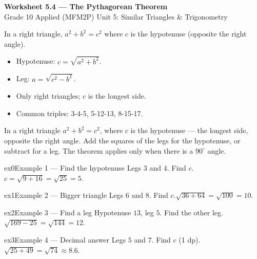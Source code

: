 \documentclass[11pt]{article}
\begin{document}
\begin{center}
{\LARGE\bfseries\color{titleblue}Worksheet 5.4 --- The Pythagorean Theorem}\\[2pt]
{\small Grade 10 Applied (MFM2P) \textperiodcentered{} Unit 5: Similar Triangles \& Trigonometry}
\end{center}

\begin{ideabox}
In a right triangle, $a^2+b^2=c^2$ where $c$ is the hypotenuse (opposite the right angle).
\begin{itemize}[leftmargin=*,itemsep=2pt]
  \item Hypotenuse: $c=\sqrt{a^2+b^2}$.
  \item Leg: $a=\sqrt{c^2-b^2}$.
  \item Only right triangles; $c$ is the longest side.
  \item Common triples: 3-4-5, 5-12-13, 8-15-17.
\end{itemize}
\end{ideabox}

\begin{learnbox}
In a right triangle $a^2+b^2=c^2$, where $c$ is the hypotenuse — the longest side, opposite the right angle.
Add the squares of the legs for the hypotenuse, or subtract for a leg.
The theorem applies only when there is a $90^\circ$ angle.
\end{learnbox}


\begin{example}{ex0}{Example 1 --- Find the hypotenuse}
Legs $3$ and $4$. Find $c$.\soln $c=\sqrt{9+16}=\sqrt{25}=5$.
\end{example}

\begin{example}{ex1}{Example 2 --- Bigger triangle}
Legs $6$ and $8$. Find $c$.\soln $\sqrt{36+64}=\sqrt{100}=10$.
\end{example}

\begin{example}{ex2}{Example 3 --- Find a leg}
Hypotenuse $13$, leg $5$. Find the other leg.\soln $\sqrt{169-25}=\sqrt{144}=12$.
\end{example}

\begin{example}{ex3}{Example 4 --- Decimal answer}
Legs $5$ and $7$. Find $c$ (1 dp).\soln $\sqrt{25+49}=\sqrt{74}\approx8.6$.
\end{example}
\end{document}
